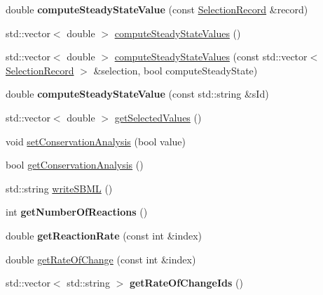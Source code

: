 \begin{DoxyCompactItemize}
\item 
\hypertarget{classrr_1_1_road_runner_a0738b1cb3659a2d7d027f7653facf70c}{double {\bfseries compute\-Steady\-State\-Value} (const \hyperlink{classrr_1_1_selection_record}{Selection\-Record} \&record)}\label{classrr_1_1_road_runner_a0738b1cb3659a2d7d027f7653facf70c}

\item 
std\-::vector$<$ double $>$ \hyperlink{classrr_1_1_road_runner_ab8cc67d7107205fe8e5f253bccbb208b}{compute\-Steady\-State\-Values} ()
\item 
std\-::vector$<$ double $>$ \hyperlink{classrr_1_1_road_runner_a9f08b6d6151a3635a2d4618f8c700b53}{compute\-Steady\-State\-Values} (const std\-::vector$<$ \hyperlink{classrr_1_1_selection_record}{Selection\-Record} $>$ \&selection, bool compute\-Steady\-State)
\item 
\hypertarget{classrr_1_1_road_runner_aab81568c3bf4b73f49fd7a746f8bf0c8}{double {\bfseries compute\-Steady\-State\-Value} (const std\-::string \&s\-Id)}\label{classrr_1_1_road_runner_aab81568c3bf4b73f49fd7a746f8bf0c8}

\item 
std\-::vector$<$ double $>$ \hyperlink{classrr_1_1_road_runner_a9c98b4f3d57c4935b744d8cd831d4a61}{get\-Selected\-Values} ()
\item 
void \hyperlink{classrr_1_1_road_runner_a1e7fa0ce52890140e95014dc452ef1a3}{set\-Conservation\-Analysis} (bool value)
\item 
bool \hyperlink{classrr_1_1_road_runner_a51edc11ea3158972f7109dd73a084286}{get\-Conservation\-Analysis} ()
\item 
std\-::string \hyperlink{classrr_1_1_road_runner_a2a2507cc2964f8aef0d200c5841bc218}{write\-S\-B\-M\-L} ()
\item 
\hypertarget{classrr_1_1_road_runner_a0aeef3b4db855e2cd6e901372c9082f2}{int {\bfseries get\-Number\-Of\-Reactions} ()}\label{classrr_1_1_road_runner_a0aeef3b4db855e2cd6e901372c9082f2}

\item 
\hypertarget{classrr_1_1_road_runner_a9284f10d515b8ef441473b5c14f5920e}{double {\bfseries get\-Reaction\-Rate} (const int \&index)}\label{classrr_1_1_road_runner_a9284f10d515b8ef441473b5c14f5920e}

\item 
double \hyperlink{classrr_1_1_road_runner_a67736588f72a8fb4f429368716acda93}{get\-Rate\-Of\-Change} (const int \&index)
\item 
\hypertarget{classrr_1_1_road_runner_a5d9266988c75e838d2a2c020a35304b2}{std\-::vector$<$ std\-::string $>$ {\bfseries get\-Rate\-Of\-Change\-Ids} ()}\label{classrr_1_1_road_runner_a5d9266988c75e838d2a2c020a35304b2}


\end{DoxyCompactItemize}
